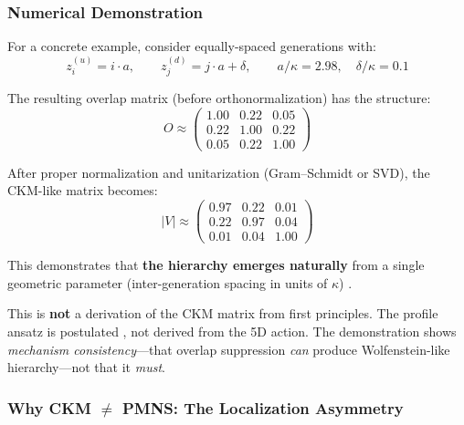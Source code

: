 \subsubsection{Numerical Demonstration}

For a concrete example, consider equally-spaced generations with:
\begin{equation}
    z_i^{(u)} = i \cdot a, \qquad
    z_j^{(d)} = j \cdot a + \delta, \qquad
    a/\kappa = 2.98, \quad \delta/\kappa = 0.1
    \label{eq:ch7_demo_params}
\end{equation}

The resulting overlap matrix (before orthonormalization) has the structure:
\begin{equation}
    O \approx
    \begin{pmatrix}
        1.00 & 0.22 & 0.05 \\
        0.22 & 1.00 & 0.22 \\
        0.05 & 0.22 & 1.00
    \end{pmatrix}
    \label{eq:ch7_demo_matrix}
\end{equation}

After proper normalization and unitarization (Gram--Schmidt or SVD), the
CKM-like matrix becomes:
\begin{equation}
    |V| \approx
    \begin{pmatrix}
        0.97 & 0.22 & 0.01 \\
        0.22 & 0.97 & 0.04 \\
        0.01 & 0.04 & 1.00
    \end{pmatrix}
    \label{eq:ch7_demo_ckm}
\end{equation}

This demonstrates that \textbf{the hierarchy emerges naturally} from a single
geometric parameter (inter-generation spacing in units of $\kappa$) \tagDc{}.

\begin{tcolorbox}[edcGuardrail, title=\textbf{What This Is NOT}]
This is \textbf{not} a derivation of the CKM matrix from first principles.
The profile ansatz is postulated \tagP{}, not derived from the 5D action.
The demonstration shows \emph{mechanism consistency}---that overlap suppression
\emph{can} produce Wolfenstein-like hierarchy---not that it \emph{must}.
\end{tcolorbox}

\subsubsection{Why CKM $\neq$ PMNS: The Localization Asymmetry}

